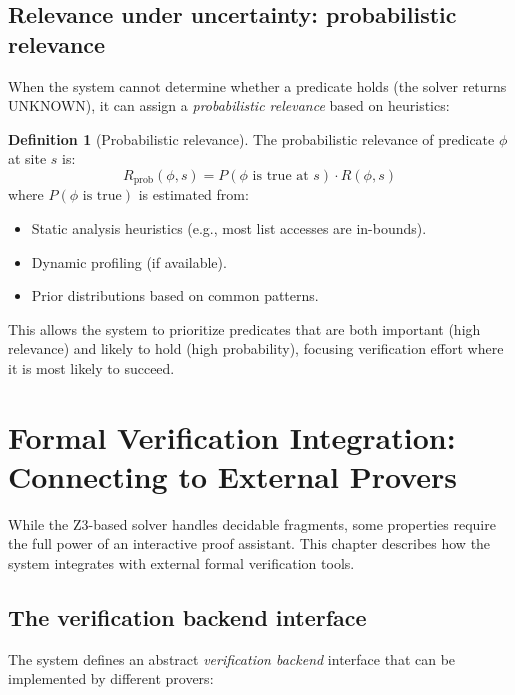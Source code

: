 \documentclass[11pt]{report}
\theoremstyle{definition}
\newtheorem{definition}{Definition}[section]
\theoremstyle{plain}
\begin{document}
\section{Relevance under uncertainty: probabilistic relevance}

When the system cannot determine whether a predicate holds (the solver
returns UNKNOWN), it can assign a \emph{probabilistic relevance} based on
heuristics:

\begin{definition}[Probabilistic relevance]
The probabilistic relevance of predicate $\phi$ at site $s$ is:
\[
  R_{\mathrm{prob}}(\phi, s) = P(\phi \text{ is true at } s) \cdot
    R(\phi, s)
\]
where $P(\phi \text{ is true})$ is estimated from:
\begin{itemize}[nosep]
  \item Static analysis heuristics (e.g., most list accesses are in-bounds).
  \item Dynamic profiling (if available).
  \item Prior distributions based on common patterns.
\end{itemize}
\end{definition}

This allows the system to prioritize predicates that are both important
(high relevance) and likely to hold (high probability), focusing verification
effort where it is most likely to succeed.


\chapter{Formal Verification Integration: Connecting to External Provers}

While the Z3-based solver handles decidable fragments, some properties
require the full power of an interactive proof assistant. This chapter
describes how the system integrates with external formal verification tools.

\section{The verification backend interface}

The system defines an abstract \emph{verification backend} interface that
can be implemented by different provers:
\end{document}
